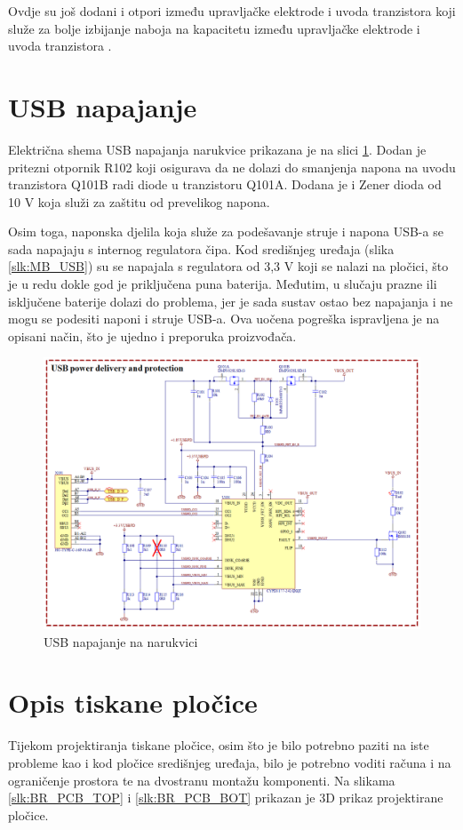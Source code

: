Ovdje su još dodani i otpori između upravljačke elektrode i uvoda tranzistora koji služe za bolje izbijanje naboja na kapacitetu između upravljačke elektrode i uvoda tranzistora \cite{ti:bq29700}.

\section{USB napajanje}
\label{sec:BR_USB}
Električna shema USB napajanja narukvice prikazana je na slici \ref{slk:BR_USB}. Dodan je pritezni otpornik R102 koji osigurava da ne dolazi do smanjenja napona na uvodu tranzistora Q101B radi diode u tranzistoru Q101A. Dodana je i Zener dioda od 10 V koja služi za zaštitu od prevelikog napona.

Osim toga, naponska djelila koja služe za podešavanje struje i napona USB-a se sada napajaju s internog regulatora čipa. Kod središnjeg uređaja (slika \ref{slk:MB_USB}) su se napajala s regulatora od 3,3 V koji se nalazi na pločici, što je u redu dokle god je priključena puna baterija. Međutim, u slučaju prazne ili isključene baterije dolazi do problema, jer je sada sustav ostao bez napajanja i ne mogu se podesiti naponi i struje USB-a. Ova uočena pogreška ispravljena je na opisani način, što je ujedno i preporuka proizvođača.
\begin{figure}[htb]
    \centering
    \includegraphics[width=\textwidth]{Figures/BR_USB.png}
    \caption{USB napajanje na narukvici}
    \label{slk:BR_USB}
\end{figure}
\section{Opis tiskane pločice}
Tijekom projektiranja tiskane pločice, osim što je bilo potrebno paziti na iste probleme kao i kod pločice središnjeg uređaja, bilo je potrebno voditi računa i na ograničenje prostora te na dvostranu montažu komponenti. Na slikama \ref{slk:BR_PCB_TOP} i \ref{slk:BR_PCB_BOT} prikazan je 3D prikaz projektirane pločice.

